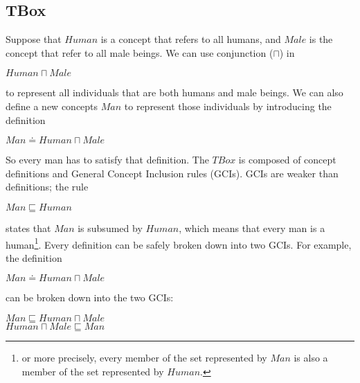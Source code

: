 \documentclass{sfuthesis}
\theoremstyle{plain}
\theoremstyle{definition}
\begin{document}
\subsection{TBox}
Suppose that $Human$ is a concept that refers to all humans, and $Male$ is the concept that refer to all male beings. We can use conjunction ($\sqcap$) in
\begin{center}
$Human \sqcap Male$
\end{center}
to represent all individuals that are both humans and male beings. We can also define a new concepts $Man$ to represent those individuals by introducing the definition
\begin{center}
$Man \doteq Human \sqcap Male$
\end{center}
So every man has to satisfy that definition. The $TBox$ is composed of concept definitions and General Concept Inclusion rules (GCIs). GCIs are weaker than definitions; the rule
\begin{center}
$Man \sqsubseteq Human$
\end{center}
states that $Man$ is subsumed by $Human$, which means that every man is a human\footnote{or more precisely, every member of the set represented by $Man$ is also a member of the set represented by $Human$.}. Every definition can be safely broken down into two GCIs. For example, the definition
\begin{center}
$Man \doteq Human \sqcap Male$
\end{center}
can be broken down into the two GCIs:
\begin{center}
$Man \sqsubseteq Human \sqcap Male$ \\
$Human \sqcap Male \sqsubseteq Man$
\end{center}
\end{document}
